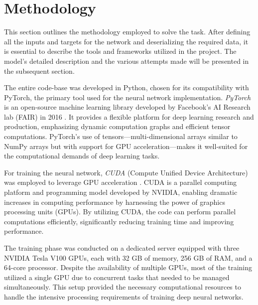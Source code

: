 \section{Methodology}

This section outlines the methodology employed to solve the task. After defining all the inputs and targets for the network and deserializing the required data, it is essential to describe the tools and frameworks utilized in the project. The model's detailed description and the various attempts made will be presented in the subsequent section.

The entire code-base was developed in Python, chosen for its compatibility with PyTorch, the primary tool used for the neural network implementation. \textit{PyTorch} is an open-source machine learning library developed by Facebook's AI Research lab (FAIR) in 2016 \cite{NEURIPS2019_9015}. It provides a flexible platform for deep learning research and production, emphasizing dynamic computation graphs and efficient tensor computations. PyTorch's use of tensors—multi-dimensional arrays similar to NumPy \cite{harris2020array} arrays but with support for GPU acceleration—makes it well-suited for the computational demands of deep learning tasks.

For training the neural network, \textit{CUDA} (Compute Unified Device Architecture) was employed to leverage GPU acceleration \cite{cuda}. CUDA is a parallel computing platform and programming model developed by NVIDIA, enabling dramatic increases in computing performance by harnessing the power of graphics processing units (GPUs). By utilizing CUDA, the code can perform parallel computations efficiently, significantly reducing training time and improving performance.

The training phase was conducted on a dedicated server equipped with three NVIDIA Tesla V100 GPUs, each with 32 GB of memory, 256 GB of RAM, and a 64-core processor. Despite the availability of multiple GPUs, most of the training utilized a single GPU due to concurrent tasks that needed to be managed simultaneously. This setup provided the necessary computational resources to handle the intensive processing requirements of training deep neural networks.
